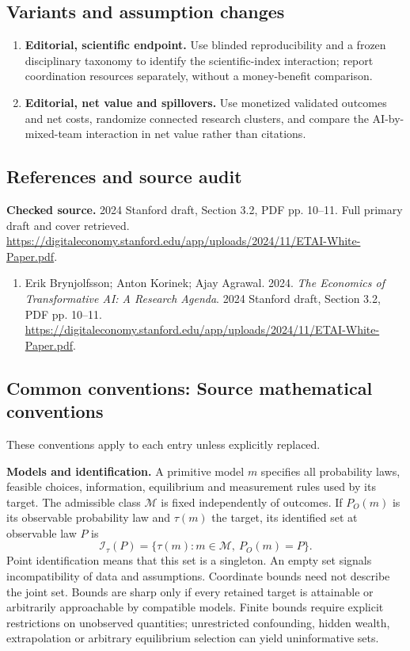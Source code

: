 \documentclass[11pt,a4paper]{article}
\begin{document}
\subsection*{Variants and assumption changes}
\begin{enumerate}
\item \textbf{Editorial, scientific endpoint.} Use blinded reproducibility and a frozen disciplinary taxonomy to identify the scientific-index interaction; report coordination resources separately, without a money-benefit comparison.
\item \textbf{Editorial, net value and spillovers.} Use monetized validated outcomes and net costs, randomize connected research clusters, and compare the AI-by-mixed-team interaction in net value rather than citations.
\end{enumerate}
\subsection*{References and source audit}
\textbf{Checked source.} 2024 Stanford draft, Section 3.2, PDF pp. 10--11. Full primary draft and cover retrieved. \url{https://digitaleconomy.stanford.edu/app/uploads/2024/11/ETAI-White-Paper.pdf}.
\begin{enumerate}\raggedright
\item\hypertarget{definitions:source:30007693:1}{} Erik Brynjolfsson; Anton Korinek; Ajay Agrawal. 2024. \emph{The Economics of Transformative AI: A Research Agenda}. 2024 Stanford draft, Section 3.2, PDF pp. 10--11.
\url{https://digitaleconomy.stanford.edu/app/uploads/2024/11/ETAI-White-Paper.pdf}.
\end{enumerate}

\subsection*{Common conventions: Source mathematical conventions}

These conventions apply to each entry unless explicitly replaced.

\textbf{Models and identification.} A primitive model \(m\) specifies all probability laws, feasible choices, information, equilibrium and measurement rules used by its target. The admissible class \(\mathcal M\) is fixed independently of outcomes. If \(P_O(m)\) is its observable probability law and \(\tau(m)\) the target, its identified set at observable law \(P\) is
\[
 \mathcal I_\tau(P)=\{\tau(m):m\in\mathcal M,\ P_O(m)=P\}.
\]
Point identification means that this set is a singleton. An empty set signals incompatibility of data and assumptions. Coordinate bounds need not describe the joint set. Bounds are sharp only if every retained target is attainable or arbitrarily approachable by compatible models. Finite bounds require explicit restrictions on unobserved quantities; unrestricted confounding, hidden wealth, extrapolation or arbitrary equilibrium selection can yield uninformative sets.
\end{document}
